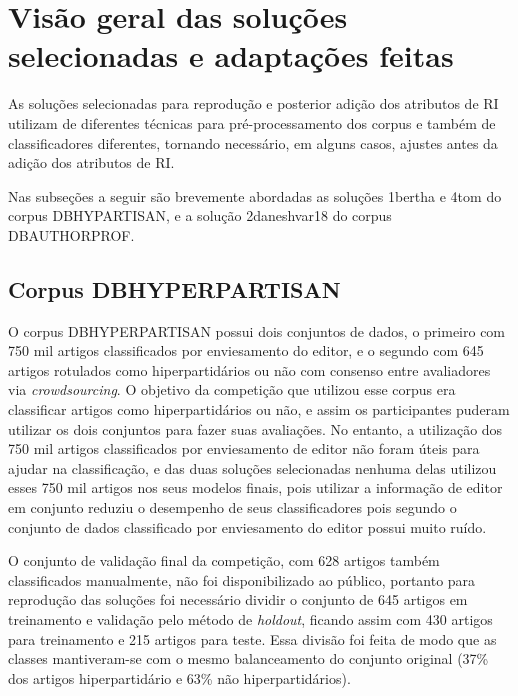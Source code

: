 	\section{Visão geral das soluções selecionadas e adaptações feitas} \label{sec:VisãoSoluçõesEAdaptações}
		As soluções selecionadas para reprodução e posterior adição dos atributos de RI utilizam de diferentes técnicas para pré-processamento dos corpus e também de classificadores diferentes, tornando necessário, em alguns casos, ajustes antes da adição dos atributos de RI.

		Nas subseções a seguir são brevemente abordadas as soluções 1\underscore{}bertha e 4\underscore{}tom do corpus DB\underscore{}HYPARTISAN, e a solução 2\underscore{}daneshvar18 do corpus DB\underscore{}AUTHORPROF.

		\subsection{Corpus DB\underscore{}HYPERPARTISAN}
			O corpus DB\underscore{}HYPERPARTISAN possui dois conjuntos de dados, o primeiro com 750 mil artigos classificados por enviesamento do editor, e o segundo com 645 artigos rotulados como hiperpartidários ou não com consenso entre avaliadores via \textit{crowdsourcing}.
			O objetivo da competição que utilizou esse corpus era classificar artigos como hiperpartidários ou não, e assim os participantes puderam utilizar os dois conjuntos para fazer suas avaliações. 
			No entanto, a utilização dos 750 mil artigos classificados por enviesamento de editor não foram úteis para ajudar na classificação, e das duas soluções selecionadas nenhuma delas utilizou esses 750 mil artigos nos seus modelos finais, pois utilizar a informação de editor em conjunto reduziu o desempenho de seus classificadores \cite[p.~840]{jiang-etal-2019-team} pois segundo  o conjunto de dados classificado por enviesamento do editor possui muito ruído.

			O conjunto de validação final da competição, com 628 artigos também classificados manualmente, não foi disponibilizado ao público, portanto para reprodução das soluções foi necessário dividir o conjunto de 645 artigos em treinamento e validação pelo método de \textit{holdout}, ficando assim com 430 artigos para treinamento e 215 artigos para teste. 
			Essa divisão foi feita de modo que as classes mantiveram-se com o mesmo balanceamento do conjunto original (37\% dos artigos hiperpartidário e 63\% não hiperpartidários).

